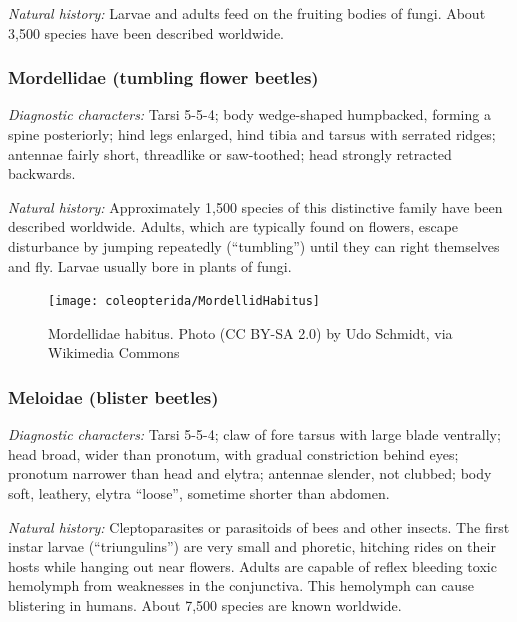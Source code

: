 \noindent{}\textit{Natural history:} Larvae and adults feed on the fruiting bodies of fungi. About 3,500 species have been described worldwide.

\subsubsection{Mordellidae (tumbling flower beetles)}
\noindent{}\textit{Diagnostic characters:} Tarsi 5-5-4; body wedge-shaped humpbacked, forming a spine posteriorly; hind legs enlarged, hind tibia and tarsus with serrated ridges; antennae fairly short, threadlike or saw-toothed; head strongly retracted backwards.\vspace{3mm}

\noindent{}\textit{Natural history:} Approximately 1,500 species of this distinctive family have been described worldwide. Adults, which are typically found on flowers, escape disturbance by jumping repeatedly (``tumbling'') until they can right themselves and fly. Larvae usually bore in plants of fungi.

\begin{figure}[ht!]
  \centering
    \texttt{[image: coleopterida/MordellidHabitus]}
  \caption{Mordellidae habitus. Photo (CC BY-SA 2.0) by Udo Schmidt, via Wikimedia Commons}
  \label{fig:mordellid}
\end{figure}%

\subsubsection{Meloidae (blister beetles)}
\noindent{}\textit{Diagnostic characters:} Tarsi 5-5-4; claw of fore tarsus with large blade ventrally; head broad, wider than pronotum, with gradual constriction behind eyes; pronotum narrower than head and elytra; antennae slender, not clubbed; body soft, leathery, elytra ``loose'', sometime shorter than abdomen.\vspace{3mm}

\noindent{}\textit{Natural history:} Cleptoparasites or parasitoids of bees and other insects. The first instar larvae (``triungulins'') are very small and phoretic, hitching rides on their hosts while hanging out near flowers. Adults are capable of reflex bleeding toxic hemolymph from weaknesses in the conjunctiva. This hemolymph can cause blistering in humans. About 7,500 species are known worldwide.\vspace{3mm}

